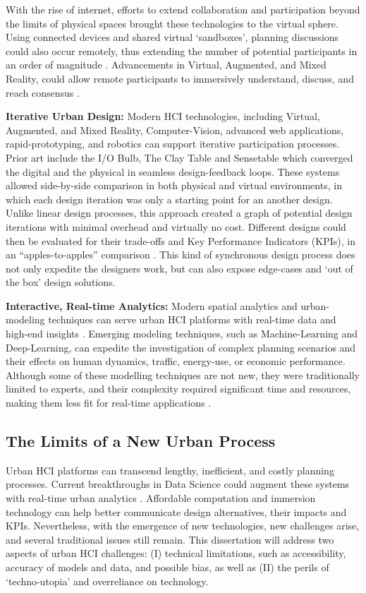 {With the rise of internet, efforts to extend collaboration and participation beyond the limits of physical spaces brought these technologies to the virtual sphere. Using connected devices and shared virtual `sandboxes', planning discussions could also occur remotely, thus extending the number of potential participants in an order of magnitude \cite{Ben-Joseph2013, banerjee2011companion, green2019smart}. Advancements in Virtual, Augmented, and Mixed Reality, could allow remote participants to immersively understand, discuss, and reach consensus \cite{bulmer_how_2001}.}

\textbf{Iterative Urban Design:}{ }{Modern HCI technologies, including Virtual, Augmented, and Mixed Reality, Computer-Vision, advanced web applications, rapid-prototyping, and robotics can support iterative participation processes. Prior art include the I/O Bulb, The Clay Table and Sensetable \cite{Ishii2004, Ishii2002, Ishii2008} which converged the digital and the physical in seamless design-feedback loops. These systems allowed side-by-side comparison in both physical and virtual environments, in which each design iteration was only a starting point for an another design. Unlike linear design processes, this approach created a graph of potential design iterations with minimal overhead and virtually no cost. Different designs could then be evaluated for their trade-offs and Key Performance Indicators (KPIs), in an ``apples-to-apples'' comparison \cite{Ishii2002}. This kind of synchronous design process does not only expedite the designers work, but can also expose edge-cases and `out of the box' design solutions.}

\textbf{Interactive, Real-time Analytics:}
{Modern spatial analytics and urban-modeling techniques can serve urban HCI platforms with real-time data and high-end insights \cite{Kitchin2014, salganik_bit_2017}. Emerging modeling techniques, such as Machine-Learning and Deep-Learning, can expedite the investigation of complex planning scenarios and their effects on human dynamics, traffic, energy-use, or economic performance. Although some of these modelling techniques are not new, they were traditionally limited to experts, and their complexity required significant time and resources, making them less fit for real-time applications \cite{Foth2011}.}

\subsection {The Limits of a New Urban Process}

{Urban HCI platforms can transcend lengthy, inefficient, and costly planning processes. Current breakthroughs in Data Science could augment these systems with real-time urban analytics \cite{Barbosa-Filho2017}. Affordable computation and immersion technology can help better communicate design alternatives, their impacts and KPIs. Nevertheless, with the emergence of new technologies, new challenges arise, and several traditional issues still remain. This dissertation will address two aspects of urban HCI challenges: (I) technical limitations, such as accessibility, accuracy of models and data, and possible bias, as well as (II) the perils of `techno-utopia' and overreliance on technology. }


